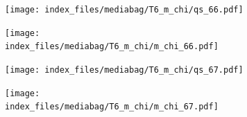 \documentclass[
  11pt,
  letterpaper,
]{scrreprt}
\begin{document}
\begin{figure}

\begin{minipage}{0.50\linewidth}

\begin{figure}[H]

{\centering \texttt{[image: index\_files/mediabag/T6\_m\_chi/qs\_66.pdf]}

}


\end{figure}%

\end{minipage}%
%
\begin{minipage}{0.50\linewidth}

\begin{figure}[H]

{\centering \texttt{[image: index\_files/mediabag/T6\_m\_chi/m\_chi\_66.pdf]}

}


\end{figure}%

\end{minipage}%

\end{figure}%

\begin{figure}

\begin{minipage}{0.50\linewidth}

\begin{figure}[H]

{\centering \texttt{[image: index\_files/mediabag/T6\_m\_chi/qs\_67.pdf]}

}


\end{figure}%

\end{minipage}%
%
\begin{minipage}{0.50\linewidth}

\begin{figure}[H]

{\centering \texttt{[image: index\_files/mediabag/T6\_m\_chi/m\_chi\_67.pdf]}

}


\end{figure}%

\end{minipage}%

\end{figure}%
\end{document}
